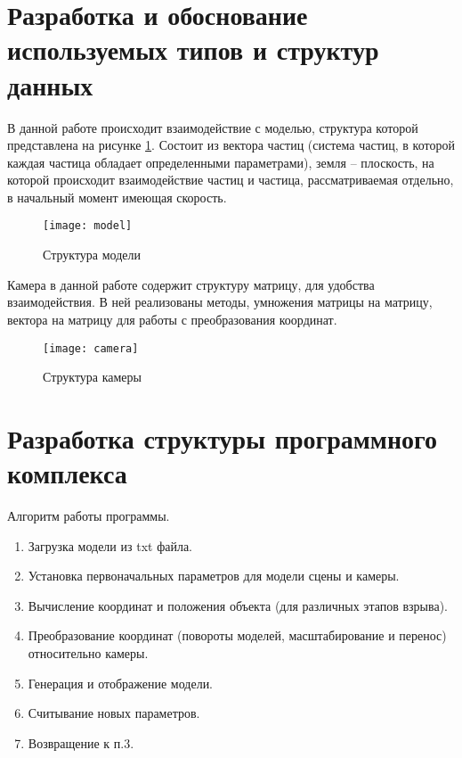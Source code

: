 \section{\textbf{Разработка и обоснование используемых типов и структур данных }}

В данной работе происходит взаимодействие с моделью, структура которой представлена на рисунке \ref{img:model}. Состоит из вектора частиц (система частиц, в которой каждая частица обладает определенными параметрами), земля -- плоскость, на которой происходит взаимодействие частиц и частица, рассматриваемая отдельно, в начальный момент имеющая скорость. 

\begin{figure}[H]
	\centering
	\texttt{[image: model]}
	\caption{Структура модели}
	\label{img:model}
\end{figure}

Камера в данной работе содержит структуру матрицу, для удобства взаимодействия. В ней реализованы методы, умножения матрицы на матрицу, вектора на матрицу для работы с преобразования координат. 

\begin{figure}[H]
	\centering
	\texttt{[image: camera]}
	\caption{Структура камеры}
	\label{img:camera}
\end{figure}

\section{\textbf{Разработка структуры программного комплекса}}
\hfill

Алгоритм работы программы. 
\begin{enumerate}
	\item[1. ] Загрузка модели из txt файла.
	\item[2. ] Установка первоначальных параметров для модели сцены и камеры. 
	\item[3. ] Вычисление координат и положения объекта (для различных этапов взрыва). 
	\item[4. ] Преобразование координат (повороты моделей, масштабирование и перенос) относительно камеры.
	\item[5. ] Генерация и отображение модели. 
	\item[6. ] Считывание новых параметров. 
	\item[7. ] Возвращение к п.3. 
\end{enumerate}



